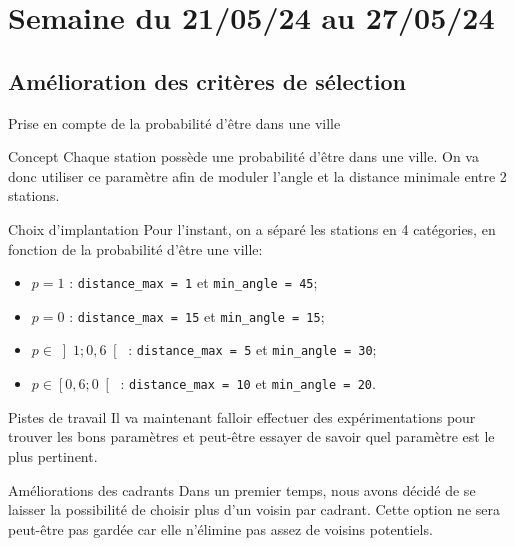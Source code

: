 \smallframetitle

\section{Semaine du 21/05/24 au 27/05/24}
\insertsectionframe

\subsection{Amélioration des critères de sélection}
\insertsubsectionframe

\begin{frame}{Prise en compte de la probabilité d'être dans une ville}
    \begin{block}{Concept}
        Chaque station possède une probabilité d'être dans une ville.
        On va donc utiliser ce paramètre afin de moduler l'angle et la distance minimale entre 2 stations.
    \end{block}

    \begin{block}{Choix d'implantation}
        Pour l'instant, on a séparé les stations en 4 catégories, en fonction de la probabilité d'être une ville:
        \begin{itemize}
            \item $p=1$ : \texttt{distance\_max = 1} et \texttt{min\_angle = 45};
            \item $p=0$ : \texttt{distance\_max = 15} et \texttt{min\_angle = 15};
            \item $p\in\left]1 ; 0,6\right[$ : \texttt{distance\_max = 5} et \texttt{min\_angle = 30};
            \item $p\in\left[0,6 ; 0\right[$ : \texttt{distance\_max = 10} et \texttt{min\_angle = 20}.
        \end{itemize}
    \end{block}
    
    \begin{alertblock}{Pistes de travail}
        Il va maintenant falloir effectuer des expérimentations pour trouver les bons paramètres et peut-être essayer de savoir quel paramètre est le plus pertinent.
    \end{alertblock}
\end{frame}

\begin{frame}{Améliorations des cadrants}
    Dans un premier temps, nous avons décidé de se laisser la possibilité de choisir plus d'un voisin par cadrant.
    Cette option ne sera peut-être pas gardée car elle n'élimine pas assez de voisins potentiels.
\end{frame}